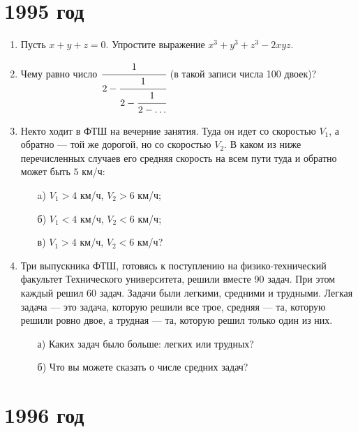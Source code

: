 \documentclass[12pt]{article}
\begin{document}
\section*{1995 год}

\begin{enumerate}
     \item Пусть $x+y+z=0$. Упростите выражение $x^3+y^3+z^3-2xyz$.
     \item Чему равно число $\cfrac{1}{2-\cfrac{1}{2-\cfrac{1}{2-\ldots}}}$  (в такой записи числа 100 двоек)?
     \item Некто ходит в ФТШ на вечерние занятия. Туда он идет со скоростью $V_1$, а обратно --- той же дорогой, но со скоростью $V_2$. В каком из ниже
        перечисленных случаев его средняя скорость на всем пути туда и обратно может быть $5$ км/ч:
        \begin{enumerate}
            \item[a)] $V_1 > 4$ км/ч, $V_2 > 6$ км/ч;
            \item[б)] $V_1 < 4$ км/ч, $V_2 < 6$ км/ч;
            \item[в)] $V_1 > 4$ км/ч, $V_2 < 6$ км/ч?
        \end{enumerate}
        
    \item Три выпускника ФТШ, готовясь к поступлению на фи\-зи\-ко-тех\-ни\-чес\-кий факультет Технического университета, решили вместе 90
    задач. При этом каждый решил 60 задач. Задачи были легкими, средними и трудными. Легкая задача --- это задача, которую решили все
    трое, средняя --- та, которую решили ровно двое, а трудная --- та, которую решил только один из них.
    \begin{enumerate}
        \item[а)] Каких задач было больше: легких или трудных?
        \item[б)] Что вы можете сказать о числе средних задач?
    \end{enumerate}
     
\end{enumerate}

\section*{1996 год}
\end{document}
